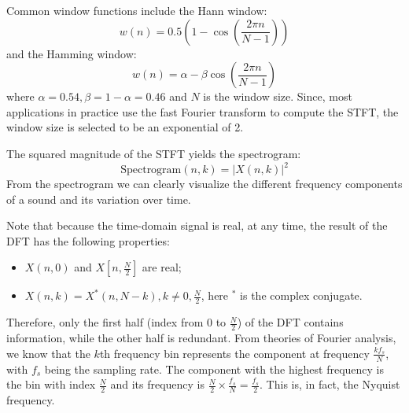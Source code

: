 \documentclass[12pt,final,twoside]{report}
\begin{document}
Common window functions include the Hann window:
\begin{equation} w(n) = 0.5 (1 - \cos(\frac{2\pi n}{N-1})) \end{equation}
and the Hamming window:
\begin{equation} w(n) = \alpha - \beta \cos(\frac{2\pi n}{N-1}) \end{equation}
where $\alpha = 0.54, \beta = 1 - \alpha = 0.46$ and $N$ is the window size.
Since, most applications in practice use the fast Fourier transform to compute the STFT, the window size is selected to be an exponential of 2.

The squared magnitude of the STFT yields the spectrogram:
\[ \text{Spectrogram}(n, k) = \left|X(n,k)\right|^2 \]
From the spectrogram we can clearly visualize the different frequency components of a sound and its variation over time.

Note that because the time-domain signal is real, at any time, the result of the DFT has the following properties:
\begin{itemize}
  \item $X(n,0)$ and $X[n, \frac{N}{2}]$ are real;
  \item $X(n,k) = X^*(n,N-k), k \neq 0, \frac{N}{2}$, here $^*$ is the complex conjugate.
\end{itemize}

Therefore, only the first half (index from $0$ to $\frac{N}{2}$) of the DFT contains information, while the other half is redundant. From theories of Fourier analysis, we know that the $k$th frequency bin represents the component at frequency $\frac{kf_s}{N}$, with $f_s$ being the sampling rate. The component with the highest frequency is the bin with index $\frac{N}{2}$ and its frequency is $\frac{N}{2} \times \frac{f_s}{N} = \frac{f_s}{2}$. This is, in fact, the Nyquist frequency.
\end{document}
